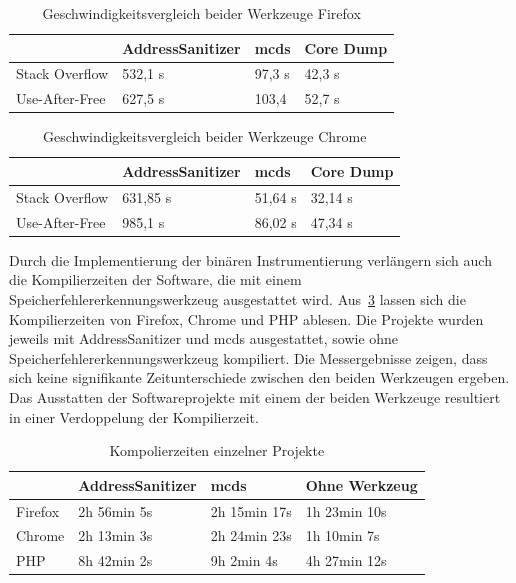 \documentclass[acmtog,nonacm]{acmart}
\begin{document}
\begin{table}[]
  \caption{Geschwindigkeitsvergleich beider Werkzeuge Firefox}
  \label{tab:firefox-error-speed}
  \begin{tabular}{l|lll}
                   & AddressSanitizer & mcds   & Core Dump \\ \hline
    Stack Overflow & 532,1 s          & 97,3 s & 42,3 s    \\
    Use-After-Free & 627,5 s          & 103,4  & 52,7 s
  \end{tabular}
\end{table}

\begin{table}[]
  \caption{Geschwindigkeitsvergleich beider Werkzeuge Chrome}
  \label{tab:chrome-error-speed}
  \begin{tabular}{l|lll}
                   & AddressSanitizer & mcds    & Core Dump \\ \hline
    Stack Overflow & 631,85 s         & 51,64 s & 32,14 s   \\
    Use-After-Free & 985,1 s          & 86,02 s & 47,34 s
  \end{tabular}
\end{table}

Durch die Implementierung der binären Instrumentierung verlängern sich auch die
Kompilierzeiten der Software, die mit einem Speicherfehlererkennungswerkzeug
ausgestattet wird. Aus~\cref{tab:compile-time} lassen sich die Kompilierzeiten
von Firefox, Chrome und PHP ablesen. Die Projekte wurden jeweils mit
AddressSanitizer und mcds ausgestattet, sowie ohne
Speicherfehlererkennungswerkzeug kompiliert. Die Messergebnisse zeigen, dass
sich keine signifikante Zeitunterschiede zwischen den beiden Werkzeugen
ergeben. Das Ausstatten der Softwareprojekte mit einem der beiden Werkzeuge
resultiert in einer Verdoppelung der Kompilierzeit.

\begin{table}[]
  \caption{Kompolierzeiten einzelner Projekte}
  \label{tab:compile-time}
  \begin{tabular}{l|lll}
            & AddressSanitizer & mcds         & Ohne Werkzeug \\ \hline
    Firefox & 2h 56min 5s      & 2h 15min 17s & 1h 23min 10s  \\
    Chrome  & 2h 13min 3s      & 2h 24min 23s & 1h 10min 7s   \\
    PHP     & 8h 42min 2s      & 9h 2min 4s   & 4h 27min 12s
  \end{tabular}
\end{table}
\end{document}
